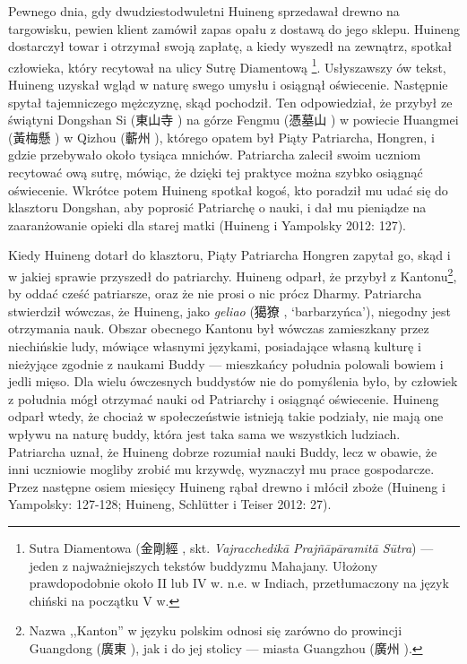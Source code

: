 Pewnego dnia, gdy dwudziestodwuletni Huineng sprzedawał drewno na targowisku, pewien klient zamówił zapas opału z dostawą do jego sklepu.
Huineng dostarczył towar i otrzymał swoją zapłatę, a kiedy wyszedł na zewnątrz, spotkał człowieka, który recytował na ulicy Sutrę Diamentową%
\footnote{Sutra Diamentowa (金剛經 , skt. \textit{Vajracchedikā Prajñāpāramitā Sūtra}) --- jeden z najważniejszych tekstów buddyzmu Mahajany. Ułożony prawdopodobnie około II lub IV w. n.e. w Indiach, przetłumaczony na język chiński na początku V w.}.\label{DiamondSutra}
Usłyszawszy ów tekst, Huineng uzyskał wgląd w naturę swego umysłu i osiągnął oświecenie. Następnie spytał tajemniczego mężczyznę, skąd pochodził.
Ten odpowiedział, że przybył ze świątyni Dongshan Si (東山寺 ) na górze Fengmu (憑墓山 ) w powiecie Huangmei (黃梅懸 ) w Qizhou (蘄州 ), którego opatem był Piąty Patriarcha, Hongren, i gdzie przebywało około tysiąca mnichów.
Patriarcha zalecił swoim uczniom recytować ową sutrę, mówiąc, że dzięki tej praktyce można szybko osiągnąć oświecenie.
Wkrótce potem Huineng spotkał kogoś, kto poradził mu udać się do klasztoru Dongshan, aby poprosić Patriarchę o nauki, i dał mu pieniądze na zaaranżowanie opieki dla starej matki
(Huineng i Yampolsky 2012: 127).

Kiedy Huineng dotarł do klasztoru, Piąty Patriarcha Hongren zapytał go, skąd i w jakiej sprawie przyszedł do patriarchy.
Huineng odparł, że przybył z Kantonu\footnote{Nazwa ,,Kanton'' w języku polskim odnosi się zarówno do prowincji Guangdong (廣東 ), jak i do jej stolicy --- miasta Guangzhou (廣州 ).}, by oddać cześć patriarsze, oraz że nie prosi o nic prócz Dharmy.
Patriarcha stwierdził wówczas, że Huineng, jako \textit{geliao} (獦獠 , `barbarzyńca'), niegodny jest otrzymania nauk.
Obszar obecnego Kantonu był wówczas zamieszkany przez niechińskie ludy, mówiące własnymi językami, posiadające własną kulturę i nieżyjące zgodnie z naukami Buddy --- mieszkańcy południa polowali bowiem i jedli mięso.
Dla wielu ówczesnych buddystów nie do pomyślenia było, by człowiek z południa mógł otrzymać nauki od Patriarchy i osiągnąć oświecenie.
Huineng odparł wtedy, że chociaż w społeczeństwie istnieją takie podziały, nie mają one wpływu na naturę buddy, która jest taka sama we wszystkich ludziach.
Patriarcha uznał, że Huineng dobrze rozumiał nauki Buddy, lecz w obawie, że inni uczniowie mogliby zrobić mu krzywdę, wyznaczył mu prace gospodarcze.
Przez następne osiem miesięcy Huineng rąbał drewno i młócił zboże
(Huineng i Yampolsky: 127-128; Huineng, Schlütter i Teiser 2012: 27).

